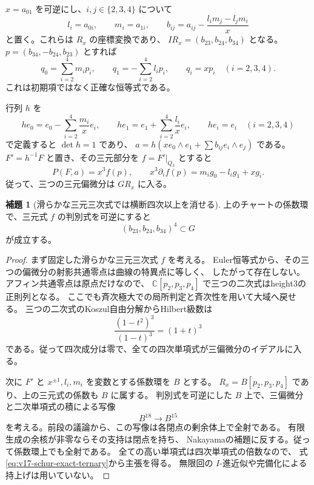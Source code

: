 \documentclass[a4paper,11pt]{ltjsarticle}
\theoremstyle{definition}
\newtheorem{lemma}[theorem]{補題}
\begin{document}
$x=a_{01}$ を可逆にし、$i,j\in\{2,3,4\}$ について
\[
 l_i=a_{0i},\qquad m_i=a_{1i},\qquad
 b_{ij}=a_{ij}-\frac{l_im_j-l_jm_i}{x}
\]
と置く。これらは $R_x$ の座標変換であり、
$I R_x=(b_{23},b_{24},b_{34})$ となる。
$p=(b_{34},-b_{24},b_{23})$ とすれば
\begin{equation}\label{eq:v17-schur-linear-pfaffian}
 q_0=\sum_{i=2}^4m_ip_i,\qquad
 q_1=-\sum_{i=2}^4l_ip_i,\qquad
 q_i=xp_i\quad(i=2,3,4).
\end{equation}
これは初期項ではなく正確な恒等式である。

行列 $h$ を
\[
 he_0=e_0-\sum_{i=2}^4\frac{m_i}{x}e_i,\qquad
 he_1=e_1+\sum_{i=2}^4\frac{l_i}{x}e_i,\qquad
 he_i=e_i\quad(i=2,3,4)
\]
で定義すると $\det h=1$ であり、
$a=h(xe_0\wedge e_1+\sum b_{ij}e_i\wedge e_j)$ である。
$F'=h^{-1}F$ と置き、その三元部分を $f=F'|_{Q_3}$ とすると
\begin{equation}\label{eq:v17-schur-exact-ternary}
 P(F,a)=x^3f(p),\qquad
 x^3\partial_i f(p)=m_ig_0-l_ig_1+xg_i.
\end{equation}
従って、三つの三元偏微分は $G R_x$ に入る。

\begin{lemma}[滑らかな三元三次式では横断四次以上を消せる]
\label{lem:v17-smooth-ternary-fourth-power}
上のチャートの係数環で、三元式 $f$ の判別式を可逆にすると
\begin{equation}\label{eq:v17-normal-fourth-in-gradient}
 (b_{23},b_{24},b_{34})^4\subset G
\end{equation}
が成立する。
\end{lemma}

\begin{proof}
まず固定した滑らかな三元三次式 $f$ を考える。
Euler恒等式から、その三つの偏微分の射影共通零点は曲線の特異点に等しく、
したがって存在しない。アフィン共通零点は原点だけなので、
$\mathbb C[p_2,p_3,p_4]$ で三つの二次式はheight3の正則列となる。
ここでも斉次極大での局所判定と斉次性を用いて大域へ戻せる。
三つの二次式のKoszul自由分解からHilbert級数は
\[
 \frac{(1-t^2)^3}{(1-t)^3}=(1+t)^3
\]
である。従って四次成分は零で、全ての四次単項式が三偏微分のイデアルに入る。

次に $F'$ と $x^{\pm1},l_i,m_i$ を変数とする係数環を $B$ とする。
$R_x=B[p_2,p_3,p_4]$ であり、上の三元式の係数も $B$ に属する。
判別式を可逆にした $B$ 上で、三偏微分と二次単項式の積による写像
\[
 B^{18}\longrightarrow B^{15}
\]
を考える。前段の議論から、この写像は各閉点の剰余体上で全射である。
有限生成の余核が非零ならその支持は閉点を持ち、
Nakayamaの補題に反する。従って係数環上でも全射である。
全ての高い単項式は四次単項式の倍数なので、
式\eqref{eq:v17-schur-exact-ternary}から主張を得る。
無限回の $I$-進近似や完備化による持上げは用いていない。
\end{proof}
\end{document}
